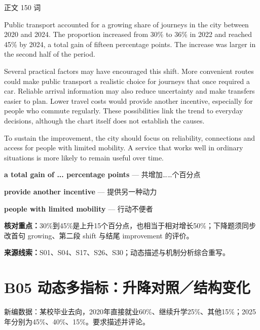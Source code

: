 \documentclass[11pt,a4paper,fontset=macnew]{ctexart}
\newenvironment{example}{\begingroup\fontsize{11}{14.3}\selectfont\setlength{\parskip}{4pt}}{\par\endgroup}
\begin{document}
\par\vspace{4pt}{\bfseries 完整套用示例}\par\nopagebreak
{\small 正文 150 词}\par
\begin{example}
Public transport accounted for a growing share of journeys in the city between 2020 and 2024. The proportion increased from 30\% to 36\% in 2022 and reached 45\% by 2024, a total gain of fifteen percentage points. The increase was larger in the second half of the period.

Several practical factors may have encouraged this shift. More convenient routes could make public transport a realistic choice for journeys that once required a car. Reliable arrival information may also reduce uncertainty and make transfers easier to plan. Lower travel costs would provide another incentive, especially for people who commute regularly. These possibilities link the trend to everyday decisions, although the chart itself does not establish the causes.

To sustain the improvement, the city should focus on reliability, connections and access for people with limited mobility. A service that works well in ordinary situations is more likely to remain useful over time.

\end{example}
\par\vspace{4pt}{\bfseries 好词好句：优先记这三处}\par\nopagebreak
{\small\textbf{a total gain of ... percentage points} — 共增加……个百分点}\par
{\small\textbf{provide another incentive} — 提供另一种动力}\par
{\small\textbf{people with limited mobility} — 行动不便者}\par
{\small\textbf{核对重点：}30\%到45\%是上升15个百分点，也相当于相对增长50\%；下降题须同步改首句 growing、第二段 shift 与结尾 improvement 的评价。}\par
{\fontsize{8}{10}\selectfont\textbf{来源线索：}S01、S04、S17、S26、S30；动态描述与机制分析综合重写。}\par
\clearpage\section*{B05  动态多指标：升降对照／结构变化}
{\small 新编数据：某校毕业去向，2020年直接就业60\%、继续升学25\%、其他15\%；2025年分别为45\%、40\%、15\%。要求描述并评论。}\par
\end{document}
